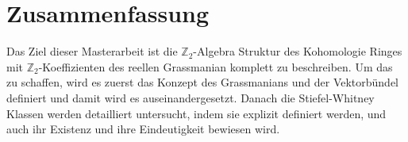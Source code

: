 \chapter*{Zusammenfassung}
Das Ziel dieser Masterarbeit ist die $\mathbb{Z}_2$-Algebra Struktur des Kohomologie Ringes mit $\mathbb{Z}_2$-Koeffizienten des reellen Grassmanian komplett zu beschreiben. Um das zu schaffen, wird es zuerst das Konzept des Grassmanians und der Vektorbündel definiert und damit wird es auseinandergesetzt. Danach die Stiefel-Whitney Klassen werden detailliert untersucht, indem sie explizit definiert werden, und auch ihr Existenz und ihre Eindeutigkeit bewiesen wird.
